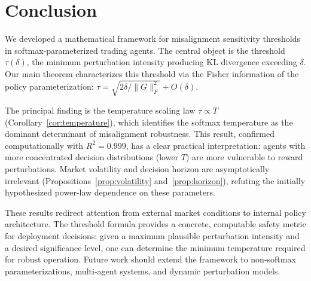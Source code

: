 \section{Conclusion}\label{sec:conclusion}

We developed a mathematical framework for misalignment sensitivity thresholds
in softmax-parameterized trading agents. The central object is the threshold
$\tau(\delta)$, the minimum perturbation intensity producing KL divergence
exceeding $\delta$. Our main theorem characterizes this threshold via the
Fisher information of the policy parameterization:
$\tau = \sqrt{2\delta/\lVert G \rVert_F^2} + O(\delta)$.

The principal finding is the temperature scaling law $\tau \propto T$
(Corollary~\ref{cor:temperature}), which identifies the softmax temperature
as the dominant determinant of misalignment robustness. This result, confirmed
computationally with $R^2 = 0.999$, has a clear practical interpretation:
agents with more concentrated decision distributions (lower $T$) are more
vulnerable to reward perturbations. Market volatility and decision horizon
are asymptotically irrelevant (Propositions~\ref{prop:volatility}
and~\ref{prop:horizon}), refuting the initially hypothesized power-law
dependence on these parameters.

These results redirect attention from external market conditions to internal
policy architecture. The threshold formula provides a concrete, computable
safety metric for deployment decisions: given a maximum plausible perturbation
intensity and a desired significance level, one can determine the minimum
temperature required for robust operation. Future work should extend the
framework to non-softmax parameterizations, multi-agent systems, and dynamic
perturbation models.
